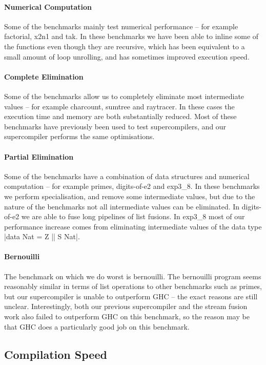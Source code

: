 \documentclass[draft]{sigplanconf}
\begin{document}
\paragraph{Numerical Computation} Some of the benchmarks mainly test numerical performance -- for example factorial, x2n1 and tak. In these benchmarks we have been able to inline some of the functions even though they are recursive, which has been equivalent to a small amount of loop unrolling, and has sometimes improved execution speed.

\paragraph{Complete Elimination} Some of the benchmarks allow us to completely eliminate most intermediate values -- for example charcount, sumtree and raytracer. In these cases the execution time and memory are both substantially reduced. Most of these benchmarks have previously been used to test supercompilers, and our supercompiler performs the same optimisations.

\paragraph{Partial Elimination} Some of the benchmarks have a combination of data structures and numerical computation -- for example primes, digits-of-e2 and exp3\_8. In these benchmarks we perform specialisation, and remove some intermediate values, but due to the nature of the benchmarks not all intermediate values can be eliminated. In digits-of-e2 we are able to fuse long pipelines of list fusions. In exp3\_8 most of our performance increase comes from eliminating intermediate values of the data type |data Nat = Z || S Nat|.

\paragraph{Bernouilli} The benchmark on which we do worst is bernouilli. The bernouilli program seems reasonably similar in terms of list operations to other benchmarks such as primes, but our supercompiler is unable to outperform GHC -- the exact reasons are still unclear. Interestingly, both our previous supercompiler and the stream fusion work also failed to outperform GHC on this benchmark, so the reason may be that GHC does a particularly good job on this benchmark.

\subsection{Compilation Speed}
\label{sec:benchmarks_compile}
\end{document}
